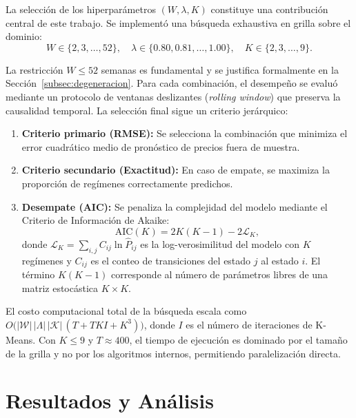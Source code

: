 La selección de los hiperparámetros $(W, \lambda, K)$ constituye una
contribución central de este trabajo.  Se implementó una búsqueda
exhaustiva en grilla sobre el dominio:
\begin{equation}
    W \in \{2, 3, \ldots, 52\}, \quad
    \lambda \in \{0.80, 0.81, \ldots, 1.00\}, \quad
    K \in \{2, 3, \ldots, 9\}.
    \label{eq:dominio_busqueda}
\end{equation}

La restricción $W \le 52$ semanas es fundamental y se justifica
formalmente en la Sección~\ref{subsec:degeneracion}.  Para cada
combinación, el desempeño se evaluó mediante un protocolo de ventanas
deslizantes (\textit{rolling window}) que preserva la causalidad
temporal.  La selección final sigue un criterio jerárquico:

\begin{enumerate}
    \item \textbf{Criterio primario (RMSE):} Se selecciona la
    combinación que minimiza el error cuadrático medio de pronóstico
    de precios fuera de muestra.
    \item \textbf{Criterio secundario (Exactitud):} En caso de
    empate, se maximiza la proporción de regímenes correctamente
    predichos.
    \item \textbf{Desempate (AIC):} Se penaliza la complejidad
    del modelo mediante el Criterio de Información de Akaike:
    \begin{equation}
        \text{AIC}(K) = 2K(K-1) - 2\mathcal{L}_K,
        \label{eq:aic_formula}
    \end{equation}
    donde $\mathcal{L}_K = \sum_{i,j} C_{ij} \ln \hat{P}_{ij}$ es
    la log-verosimilitud del modelo con $K$ regímenes y $C_{ij}$ es
    el conteo de transiciones del estado $j$ al estado $i$.  El
    término $K(K-1)$ corresponde al número de parámetros libres de
    una matriz estocástica $K \times K$.
\end{enumerate}

El costo computacional total de la búsqueda escala como
$O\big(|\mathcal{W}|\,|\Lambda|\,|\mathcal{K}|\,(T + TKI + K^3)\big)$, 
donde $I$ es el número de iteraciones de K-Means.  Con
$K \le 9$ y $T \approx 400$, el tiempo de ejecución es dominado por
el tamaño de la grilla y no por los algoritmos internos,
permitiendo paralelización directa.

\section{Resultados y Análisis}
\label{sec:combustibles_resultados}

